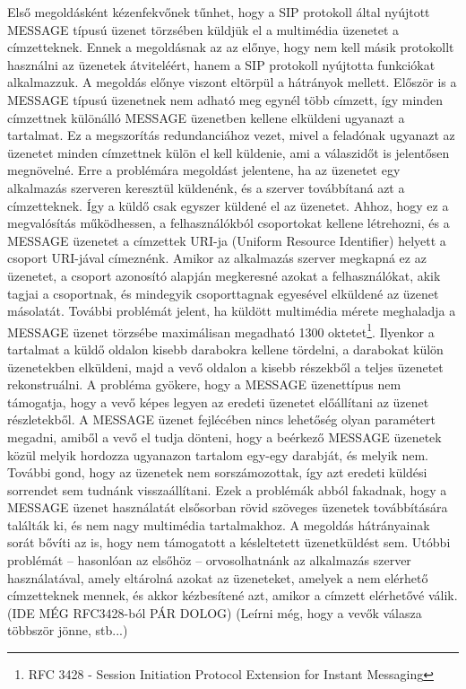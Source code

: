 Első megoldásként kézenfekvőnek tűnhet, hogy a SIP protokoll által nyújtott MESSAGE típusú üzenet törzsében küldjük el a multimédia üzenetet a címzetteknek. Ennek a megoldásnak az az előnye, hogy nem kell másik protokollt használni az üzenetek átviteléért, hanem a SIP protokoll nyújtotta funkciókat alkalmazzuk. A megoldás előnye viszont eltörpül a hátrányok mellett. Először is a MESSAGE típusú üzenetnek nem adható meg egynél több címzett, így minden címzettnek különálló MESSAGE üzenetben kellene elküldeni ugyanazt a tartalmat. Ez a megszorítás redundanciához vezet, mivel a feladónak ugyanazt az üzenetet minden címzettnek külön el kell küldenie, ami a válaszidőt is jelentősen megnövelné. Erre a problémára megoldást jelentene, ha az üzenetet egy alkalmazás szerveren keresztül küldenénk, és a szerver továbbítaná azt a címzetteknek. Így a küldő csak egyszer küldené el az üzenetet. Ahhoz, hogy ez a megvalósítás működhessen, a felhasználókból csoportokat kellene létrehozni, és a MESSAGE üzenetet a címzettek URI-ja (Uniform Resource Identifier) helyett a csoport URI-jával címeznénk. Amikor az alkalmazás szerver megkapná ez az üzenetet, a csoport azonosító alapján megkeresné azokat a felhasználókat, akik tagjai a csoportnak, és mindegyik csoporttagnak egyesével elküldené az üzenet másolatát. 
További problémát jelent, ha küldött multimédia mérete meghaladja a MESSAGE üzenet törzsébe maximálisan megadható 1300 oktetet\footnote{RFC 3428 - Session Initiation Protocol Extension for Instant Messaging}. Ilyenkor a tartalmat a küldő oldalon kisebb darabokra kellene tördelni, a darabokat külön üzenetekben elküldeni, majd a vevő oldalon a kisebb részekből a teljes üzenetet rekonstruálni. A probléma gyökere, hogy a MESSAGE üzenettípus nem támogatja, hogy a vevő képes legyen az eredeti üzenetet előállítani az üzenet részletekből. A MESSAGE üzenet fejlécében nincs lehetőség olyan paramétert megadni, amiből a vevő el tudja dönteni, hogy a beérkező MESSAGE üzenetek közül melyik hordozza ugyanazon tartalom egy-egy darabját, és melyik nem. További gond, hogy az üzenetek nem sorszámozottak, így azt eredeti küldési sorrendet sem tudnánk visszaállítani. Ezek a problémák abból fakadnak, hogy a MESSAGE üzenet használatát elsősorban rövid szöveges üzenetek továbbítására találták ki, és nem nagy multimédia tartalmakhoz. 
A megoldás hátrányainak sorát bővíti az is, hogy nem támogatott a késleltetett üzenetküldést sem. Utóbbi problémát -- hasonlóan az elsőhöz -- orvosolhatnánk az alkalmazás szerver használatával, amely eltárolná azokat az üzeneteket, amelyek a nem elérhető címzetteknek mennek, és akkor kézbesítené azt, amikor a címzett elérhetővé válik.(IDE MÉG RFC3428-ból PÁR DOLOG)
(Leírni még, hogy a vevők válasza többször jönne, stb...)

